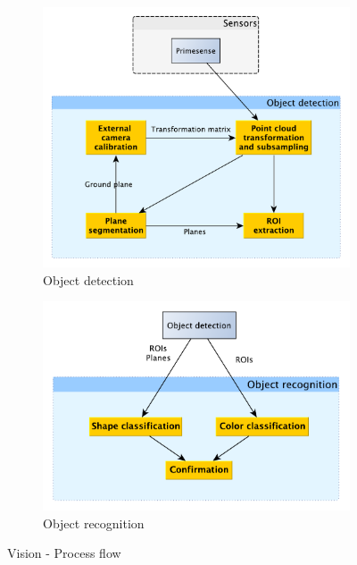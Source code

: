 \begin{figure}
\centering

\begin{subfigure}[b]{0.49\textwidth}
\centering
\includegraphics[width=\textwidth]{figures/arch_vision_obj_det.pdf}
\caption{Object detection}
\label{fig:vision:obj_det}
\end{subfigure}
\begin{subfigure}[b]{0.49\textwidth}
\centering
\includegraphics[width=\textwidth]{figures/arch_vision_obj_rec.pdf}
\caption{Object recognition}
\label{fig:vision:obj_rec}
\end{subfigure}
\caption{Vision - Process flow}
\end{figure}


